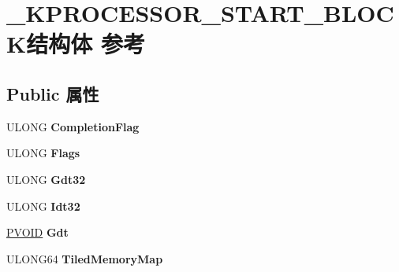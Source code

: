 \hypertarget{struct___k_p_r_o_c_e_s_s_o_r___s_t_a_r_t___b_l_o_c_k}{}\section{\+\_\+\+K\+P\+R\+O\+C\+E\+S\+S\+O\+R\+\_\+\+S\+T\+A\+R\+T\+\_\+\+B\+L\+O\+C\+K结构体 参考}
\label{struct___k_p_r_o_c_e_s_s_o_r___s_t_a_r_t___b_l_o_c_k}
\subsection*{Public 属性}
\begin{DoxyCompactItemize}
\item 
\mbox{\label{struct___k_p_r_o_c_e_s_s_o_r___s_t_a_r_t___b_l_o_c_k_a4909669e233b87407f462bfce0d39f76}} 
U\+L\+O\+NG {\bfseries Completion\+Flag}
\item 
\mbox{\label{struct___k_p_r_o_c_e_s_s_o_r___s_t_a_r_t___b_l_o_c_k_a68d9f3e759a7592ee1d675b29818fddc}} 
U\+L\+O\+NG {\bfseries Flags}
\item 
\mbox{\label{struct___k_p_r_o_c_e_s_s_o_r___s_t_a_r_t___b_l_o_c_k_a5ac9905f7e195c9317196fb78a1a9604}} 
U\+L\+O\+NG {\bfseries Gdt32}
\item 
\mbox{\label{struct___k_p_r_o_c_e_s_s_o_r___s_t_a_r_t___b_l_o_c_k_a9eaee9a0e96ffb420d5c53579d767f43}} 
U\+L\+O\+NG {\bfseries Idt32}
\item 
\mbox{\label{struct___k_p_r_o_c_e_s_s_o_r___s_t_a_r_t___b_l_o_c_k_a3d53d4d748724c742f363225089db7d3}} 
\hyperlink{interfacevoid}{P\+V\+O\+ID} {\bfseries Gdt}
\item 
\mbox{\label{struct___k_p_r_o_c_e_s_s_o_r___s_t_a_r_t___b_l_o_c_k_abb441c6c9a2502fbb71041d6fe8ec8ac}} 
U\+L\+O\+N\+G64 {\bfseries Tiled\+Memory\+Map}
\item 
\mbox{\label{struct___k_p_r_o_c_e_s_s_o_r___s_t_a_r_t___b_l_o_c_k_aa38483d6352b7f84ec4e46742417ef6e}} 

\end{DoxyCompactItemize}
